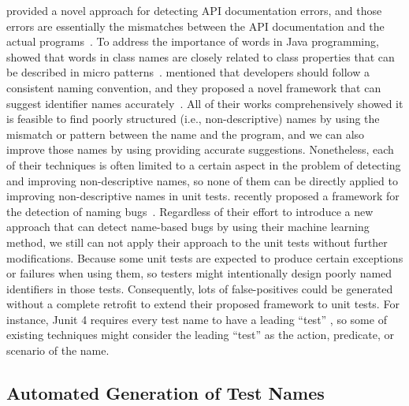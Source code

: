 \citeauthor{zhong2013detecting} provided a novel approach for detecting API documentation errors, and those errors are essentially the mismatches between the API documentation and the actual programs~\cite{zhong2013detecting}.
%
To address the importance of words in Java programming, \citeauthor{singer2008exploiting} showed that words in class names are closely related to class properties that can be described in micro patterns~\cite{singer2008exploiting}.
%
\citeauthor{allamanis2014learning} mentioned that developers should follow a consistent naming convention, and they proposed a novel framework that can suggest identifier names accurately~\cite{allamanis2014learning}.
%
All of their works comprehensively showed it is feasible to find poorly structured (i.e., non-descriptive) names by using the mismatch or pattern between the name and the program, and we can also improve those names by using providing accurate suggestions.
%
Nonetheless, each of their techniques is often limited to a certain aspect in the problem of detecting and improving non-descriptive names, so none of them can be directly applied to improving non-descriptive names in unit tests.
%
\citeauthor{pradel2018deepbugs} recently proposed a framework for the detection of naming bugs~\cite{pradel2018deepbugs}.
%
Regardless of their effort to introduce a new approach that can detect name-based bugs by using their machine learning method, we still can not apply their approach to the unit tests without further modifications.
%
Because some unit tests are expected to produce certain exceptions or failures when using them, so testers might intentionally design poorly named identifiers in those tests.
%
Consequently, lots of false-positives could be generated without a complete retrofit to extend their proposed framework to unit tests.
For instance, Junit 4 requires every test name to have a leading \enquote{test} \cite{JUnit4}, so some of existing techniques might consider the leading \enquote{test} as the action, predicate, or scenario of the name.


\subsection{Automated Generation of Test Names}

